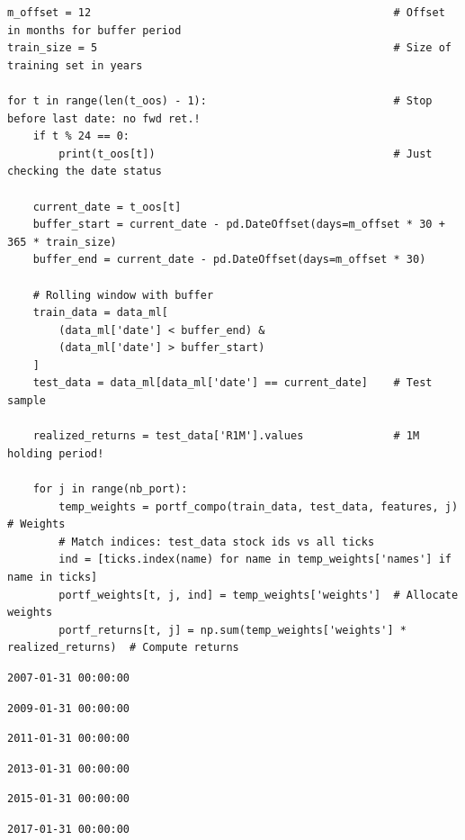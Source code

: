 \begin{verbatim}
m_offset = 12                                               # Offset in months for buffer period
train_size = 5                                              # Size of training set in years

for t in range(len(t_oos) - 1):                             # Stop before last date: no fwd ret.!
    if t % 24 == 0:
        print(t_oos[t])                                     # Just checking the date status
    
    current_date = t_oos[t]
    buffer_start = current_date - pd.DateOffset(days=m_offset * 30 + 365 * train_size)
    buffer_end = current_date - pd.DateOffset(days=m_offset * 30)
    
    # Rolling window with buffer
    train_data = data_ml[
        (data_ml['date'] < buffer_end) & 
        (data_ml['date'] > buffer_start)
    ]
    test_data = data_ml[data_ml['date'] == current_date]    # Test sample
    
    realized_returns = test_data['R1M'].values              # 1M holding period!
    
    for j in range(nb_port):
        temp_weights = portf_compo(train_data, test_data, features, j)  # Weights
        # Match indices: test_data stock ids vs all ticks
        ind = [ticks.index(name) for name in temp_weights['names'] if name in ticks]
        portf_weights[t, j, ind] = temp_weights['weights']  # Allocate weights
        portf_returns[t, j] = np.sum(temp_weights['weights'] * realized_returns)  # Compute returns
\end{verbatim}

\begin{verbatim}
2007-01-31 00:00:00
\end{verbatim}

\begin{verbatim}
2009-01-31 00:00:00
\end{verbatim}

\begin{verbatim}
2011-01-31 00:00:00
\end{verbatim}

\begin{verbatim}
2013-01-31 00:00:00
\end{verbatim}

\begin{verbatim}
2015-01-31 00:00:00
\end{verbatim}

\begin{verbatim}
2017-01-31 00:00:00
\end{verbatim}

